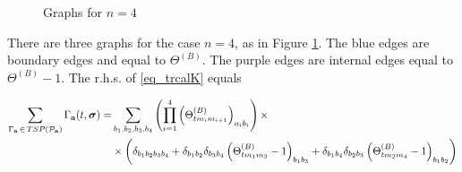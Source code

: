 \documentclass[10pt,reqno]{article}
\theoremstyle{plain} %
\theoremstyle{remark}
\numberwithin{equation}{section}
\begin{document}
\begin{figure}[ht]
{
    }
    \caption{Graphs for $n=4$}
    \label{fig_n=4}
\end{figure}
There are three graphs for the case $n = 4$, as in Figure \ref{fig_n=4}.  The blue edges are boundary edges and equal to $\Theta^{(B)}$. The purple edges are internal edges equal to  $\Theta^{(B)} - 1$.  The r.h.s. of \eqref{eq_trcalK} equals 

\begin{align}\nonumber
\sum_{\Gamma_{\textbf{a}}\, \in\,  {TSP}({\cal P}_{\textbf{a}})} \Gamma_{ \textbf{a}}(t, \boldsymbol{\sigma})= & \sum_{b_1, b_2, b_3, b_4}  \left(\prod_{i=1}^4 \left(\Theta^{(B)}_{t m_i m_{i+1}}\right)_{a_i b_i}\right) \times
\\\nonumber
& \times \left( \delta_{b_1 b_2 b_3 b_4}
+ \delta_{b_1 b_2} \delta_{b_3 b_4} \left(\Theta^{(B)}_{t m_1 m_3} - 1\right)_{b_1 b_3}
+ \delta_{b_1 b_4} \delta_{b_2 b_3} \left(\Theta^{(B)}_{t m_2 m_4} - 1\right)_{b_1 b_2}\right)
\end{align}
\end{document}
